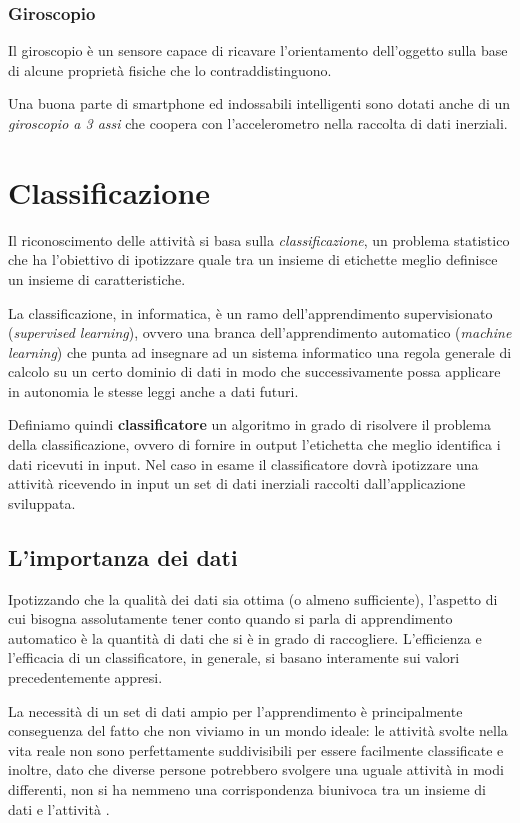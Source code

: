 \subsubsection{Giroscopio}
Il giroscopio è un sensore capace di ricavare l'orientamento dell'oggetto sulla base di alcune proprietà fisiche che lo contraddistinguono.

Una buona parte di smartphone ed indossabili intelligenti sono dotati anche di un \textit{giroscopio a 3 assi} che coopera 
con l'accelerometro nella raccolta di dati inerziali.

\section{Classificazione}
Il riconoscimento delle attività si basa sulla \textit{classificazione}, un problema statistico che ha l'obiettivo di ipotizzare 
quale tra un insieme di etichette meglio definisce un insieme di caratteristiche. 

La classificazione, in informatica, è un ramo dell'apprendimento supervisionato (\textit{supervised learning}),
ovvero una branca dell'apprendimento automatico (\textit{machine learning}) che punta ad insegnare ad un sistema informatico una regola generale
di calcolo su un certo dominio di dati in modo che successivamente possa applicare in autonomia le stesse leggi anche a dati futuri.

Definiamo quindi \textbf{classificatore} un algoritmo in grado di risolvere il problema della classificazione, ovvero di fornire in output 
l'etichetta che meglio identifica i dati ricevuti in input.
Nel caso in esame il classificatore dovrà ipotizzare una attività ricevendo in input un set di dati inerziali 
raccolti dall'applicazione sviluppata.

\subsection{L'importanza dei dati}
Ipotizzando che la qualità dei dati sia ottima (o almeno sufficiente), l'aspetto di cui bisogna assolutamente tener conto quando 
si parla di apprendimento automatico è la quantità di dati che si è in grado di raccogliere. 
L'efficienza e l'efficacia di un classificatore, in generale, si basano interamente sui valori precedentemente appresi.

La necessità di un set di dati ampio per l'apprendimento è principalmente conseguenza del fatto che non viviamo in un mondo ideale: 
le attività svolte nella vita reale non sono perfettamente suddivisibili per essere facilmente classificate e inoltre, dato che diverse persone
potrebbero svolgere una uguale attività in modi differenti, non si ha nemmeno una corrispondenza biunivoca tra un insieme di dati e l'attività \cite{framework_long_term_data_har}.



